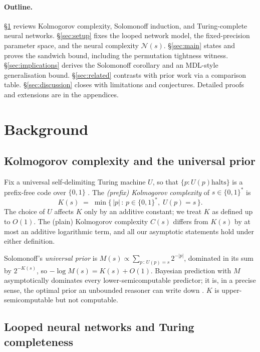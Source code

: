 \documentclass{article}
\theoremstyle{definition}
\newcommand{\B}{\{0,1\}}
\newcommand{\nc}{\mathcal{N}}
\begin{document}
\paragraph{Outline.} \S\ref{sec:bg} reviews Kolmogorov complexity, Solomonoff induction, and Turing-complete neural networks. \S\ref{sec:setup} fixes the looped network model, the fixed-precision parameter space, and the neural complexity $\nc(s)$. \S\ref{sec:main} states and proves the sandwich bound, including the permutation tightness witness. \S\ref{sec:implications} derives the Solomonoff corollary and an MDL-style generalisation bound. \S\ref{sec:related} contrasts with prior work via a comparison table. \S\ref{sec:discussion} closes with limitations and conjectures. Detailed proofs and extensions are in the appendices.

\section{Background}\label{sec:bg}

\subsection{Kolmogorov complexity and the universal prior}

Fix a universal self-delimiting Turing machine $U$, so that $\{p : U(p)\text{
    halts}\}$ is a prefix-free code over $\B$ \citep{li2008introduction}. The
\emph{(prefix) Kolmogorov complexity} of $s \in \B^*$ is
\[
  K(s) \;=\; \min \bigl\{ \, |p| \,:\, p \in \B^*,\; U(p) = s \,\bigr\}.
\]
The choice of $U$ affects $K$ only by an additive constant; we treat $K$ as
defined up to $O(1)$. The (plain) Kolmogorov complexity $C(s)$ differs from
$K(s)$ by at most an additive logarithmic term, and all our asymptotic
statements hold under either definition.

Solomonoff's \emph{universal prior} is $M(s) \propto \sum_{p \,:\, U(p)=s}
  2^{-|p|}$, dominated in its sum by $2^{-K(s)}$, so $-\log M(s) = K(s) + O(1)$.
Bayesian prediction with $M$ asymptotically dominates every
lower-semicomputable predictor; it is, in a precise sense, the optimal prior an
unbounded reasoner can write down
\citep{solomonoff1964formal,hutter2005universal,legg2007universal}. $K$ is
upper-semicomputable but not computable.

\subsection{Looped neural networks and Turing completeness}
\end{document}
